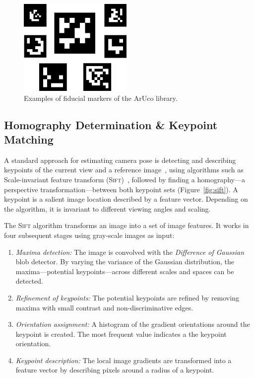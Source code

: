 \documentclass[11pt]{report}
\begin{document}


\begin{figure}[h!]
\begin{center}
\includegraphics[width=0.3\columnwidth]{markers}
\caption{{\label{fig:aruco}
Examples of fiducial markers of the ArUco library.%
}}
\end{center}
\end{figure}

\subsection{Homography Determination \& Keypoint Matching}
\label{sec:keypointmatching}

A standard approach for estimating camera pose is detecting and
describing keypoints of the current view and a reference
image~\cite{se2002global}, using algorithms such as Scale-invariant
feature transform (\textsc{Sift})~\cite{lowe1999object}, followed by
finding a homography---a perspective transformation---between both
keypoint sets (Figure~\ref{fig:sift}). A keypoint is a salient image
location described by a feature vector. Depending on the algorithm, it
is invariant to different viewing angles and scaling.

The \textsc{Sift} algorithm transforms an image into a set of image
features. It works in four subsequent stages using gray-scale images
as input:
\begin{enumerate}
\item \emph{Maxima detection:} The image is convolved with the
  \emph{Difference of Gaussian} blob detector. By varying the variance
  of the Gaussian distribution, the maxima---potential
  keypoints---across different scales and spaces can be detected.
\item \emph{Refinement of keypoints:} The potential keypoints are
  refined by removing maxima with small contrast and non-discriminative
  edges.
\item \emph{Orientation assignment:} A histogram of the gradient
  orientations around the keypoint is created. The most frequent value
  indicates a the keypoint orientation.
\item \emph{Keypoint description:} The local image gradients are
  transformed into a feature vector by describing pixels around a
  radius of a keypoint.
\end{enumerate}
\end{document}
